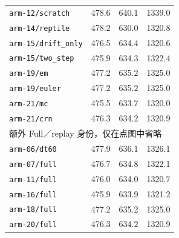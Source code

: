 \begin{longtable}{lrrr}
\texttt{arm-12/scratch} & 478.6 & 640.1 & 1339.0\\
\texttt{arm-14/reptile} & 478.2 & 630.0 & 1320.8\\
\texttt{arm-15/drift\_only} & 476.5 & 634.4 & 1320.6\\
\texttt{arm-15/two\_step} & 475.9 & 634.3 & 1322.4\\
\texttt{arm-19/em} & 477.2 & 635.2 & 1325.0\\
\texttt{arm-19/euler} & 477.2 & 635.2 & 1325.0\\
\texttt{arm-21/mc} & 475.5 & 633.7 & 1320.0\\
\texttt{arm-21/crn} & 476.3 & 634.2 & 1320.9\\
\midrule
\multicolumn{4}{l}{额外 Full／replay 身份，仅在点图中省略}\\
\texttt{arm-06/dt60} & 477.9 & 636.1 & 1326.1\\
\texttt{arm-07/full} & 476.7 & 634.8 & 1322.1\\
\texttt{arm-11/full} & 476.0 & 634.0 & 1320.7\\
\texttt{arm-16/full} & 475.9 & 633.9 & 1321.2\\
\texttt{arm-18/full} & 477.2 & 635.2 & 1325.0\\
\texttt{arm-20/full} & 476.3 & 634.2 & 1320.9\\
\end{longtable}
\endgroup
